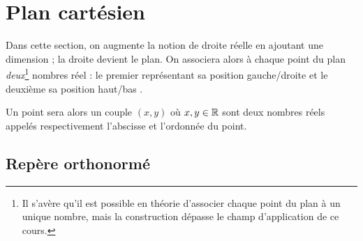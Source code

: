
\chapter{Plan cartésien}
\label{sec:geom-plane}\label{chap:plan-cartésien}


Dans cette section, on augmente la notion de droite réelle en ajoutant une dimension ; la droite devient le plan.
On associera alors à chaque point du plan \emph{deux}\footnote{Il s'avère qu'il est possible en théorie d'associer chaque point du plan à un unique nombre, mais la construction dépasse le champ d'application de ce cours.} nombres réel : le premier représentant sa position \og gauche/droite \fg et le deuxième sa position \og haut/bas \fg.

Un point sera alors un couple $(x, y)$ où $x, y \in \mathbb{R}$ sont deux nombres réels appelés respectivement l'abscisse et l'ordonnée du point.

\section{Repère orthonormé}



